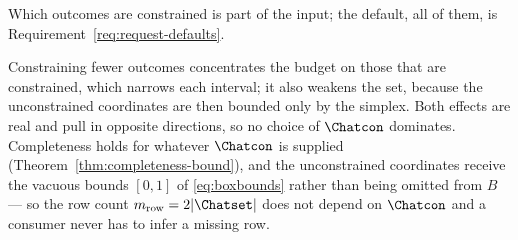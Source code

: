 
Which outcomes are constrained is part of the input; the default, all of
them, is Requirement~\ref{req:request-defaults}.

\begin{remark}\label{rem:selector}
Constraining fewer outcomes concentrates the budget on those that are
constrained, which narrows each interval; it also weakens the set, because the
unconstrained coordinates are then bounded only by the simplex. Both effects
are real and pull in opposite directions, so no choice of $\Chatcon$
dominates. Completeness holds for whatever $\Chatcon$ is supplied
(Theorem~\ref{thm:completeness-bound}), and the unconstrained coordinates receive the vacuous
bounds $[0,1]$ of \eqref{eq:boxbounds} rather than being omitted from $B$ ---
so the row count $m_{\mathrm{row}}=2|\Chatset|$ does not depend on $\Chatcon$
and a consumer never has to infer a missing row.
\end{remark}
